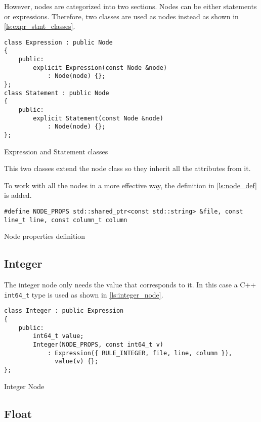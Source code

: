 However, nodes are categorized into two sections. Nodes can be either statements or expressions. Therefore, two classes
are used as nodes instead as shown in \autoref{ls:expr_stmt_classes}.

\begin{listing}[H]
\begin{verbatim}
class Expression : public Node
{
    public:
        explicit Expression(const Node &node)
            : Node(node) {};
};
class Statement : public Node
{
    public:
        explicit Statement(const Node &node)
            : Node(node) {};
};
\end{verbatim}
\caption{Expression and Statement classes}
\label{ls:expr_stmt_classes}
\end{listing}

This two classes extend the node class so they inherit all the attributes from it.

To work with all the nodes in a more effective way, the definition in \autoref{ls:node_def} is added.

\begin{listing}[H]
\begin{verbatim}
#define NODE_PROPS std::shared_ptr<const std::string> &file, const line_t line, const column_t column
\end{verbatim}
\caption{Node properties definition}
\label{ls:node_def}
\end{listing}

\subsection{Integer}

The integer node only needs the value that corresponds to it. In this case a C++ \texttt{int64\_t} type is used as shown in
\autoref{ls:integer_node}.

\begin{listing}[H]
\begin{verbatim}
class Integer : public Expression
{
    public:
        int64_t value;
        Integer(NODE_PROPS, const int64_t v)
            : Expression({ RULE_INTEGER, file, line, column }),
              value(v) {};
};
\end{verbatim}
\caption{Integer Node}
\label{ls:integer_node}
\end{listing}

\subsection{Float}

